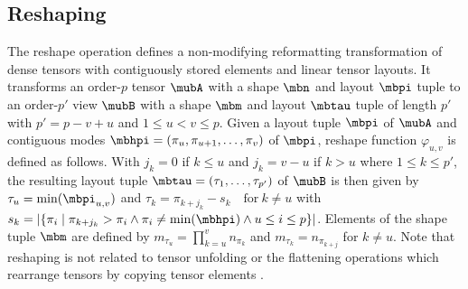 \subsection{Reshaping}
\label{sec:preliminaries:flattening.reshaping}
The reshape operation defines a non-modifying reformatting transformation of dense tensors with contiguously stored elements and linear tensor layouts.
It transforms an order-$p$ tensor $\mubA$ with a shape $\mbn$ and layout $\mbpi$ tuple to an order-$p'$ view $\mubB$ with a shape $\mbm$ and layout $\mbtau$ tuple of length $p'$ with $p' = p-v+u$ and $1 \leq u < v \leq p$.
Given a layout tuple $\mbpi$ of $\mubA$ and contiguous modes $\mbhpi = (\pi_u,\pi_{u+1}, \dots, \pi_{v})$ of $\mbpi$, reshape function $\varphi_{u,v}$ is defined as follows.
With $j_k = 0$ if $k \leq u$ and $j_k = v-u$ if $k>u$ where $1 \leq k \leq p'$, the resulting layout tuple $\mbtau = (\tau_1,\dots,\tau_{p'})$ of $\mubB$ is then given by $\tau_u = \min(\mbpi_{u,v})$ and
$\tau_k = \pi_{k+j_k} - s_k \quad \text{for} \ k \neq u$
with $s_k = \left| \{ \pi_i \mid \pi_{k+j_k} > \pi_i \wedge \pi_i \neq \min(\mbhpi) \wedge u \leq i \leq p \} \right|$.
Elements of the shape tuple $\mbm$ are defined by $m_{\tau_u} = \prod_{k=u}^v n_{\pi_k}$ and $m_{\tau_k} = n_{\pi_{k+j}}$ for $k \neq u$.
Note that reshaping is not related to tensor unfolding or the flattening operations which rearrange tensors by copying tensor elements \cite[p.459]{kolda:2009:decompositions}.




